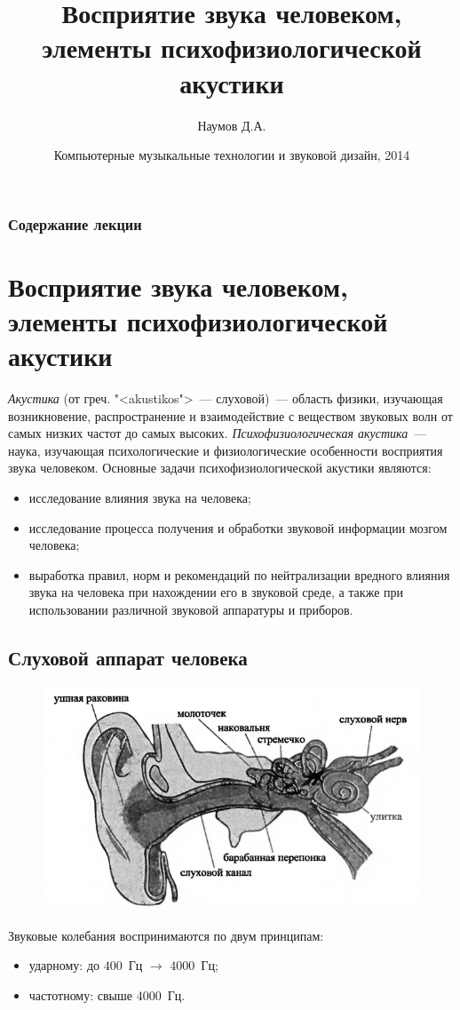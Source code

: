 \documentclass{beamer}
\title[Восприятие звука]{Восприятие звука человеком, элементы психофизиологической акустики}
\author{Наумов Д.А.}
\date[16.02.2014] {Компьютерные музыкальные технологии и звуковой дизайн, 2014}
\begin{document}
\begin{frame}
  \titlepage
\end{frame}
  
\begin{frame}
  \frametitle{Содержание лекции}
  \tableofcontents  
\end{frame}
  
\section[Элементы психофизиологической акустики]{Восприятие звука человеком, элементы психофизиологической акустики}
\begin{frame}
{\itshape Акустика} (от греч. "<akustikos">~--- слуховой)~--- область физики, изучающая возникновение, распространение и взаимодействие с веществом звуковых волн от самых низких частот до самых высоких.
{\itshape Психофизиологическая акустика}~--- наука, изучающая психологические и физиологические особенности восприятия звука человеком. Основные задачи психофизиологической акустики являются: 
\begin{itemize}
\item исследование влияния звука на человека;
\item исследование процесса получения и обработки звуковой информации мозгом человека;
\item выработка правил, норм и рекомендаций по нейтрализации вредного влияния звука на человека при нахождении его в звуковой среде, а также при использовании различной звуковой аппаратуры и приборов.
\end{itemize} 
\end{frame}   

\begin{frame}
\section{Слуховой аппарат человека}
\begin{figure}
\centering
\includegraphics[width=0.9\linewidth]{pic-ear-01}
\end{figure}
Звуковые колебания воспринимаются по двум принципам:
\begin{itemize}
\item ударному: до $400$~Гц $\rightarrow$ $4000$~Гц;
\item частотному: свыше $4000$~Гц.
\end{itemize}
\end{frame}
\end{document}
